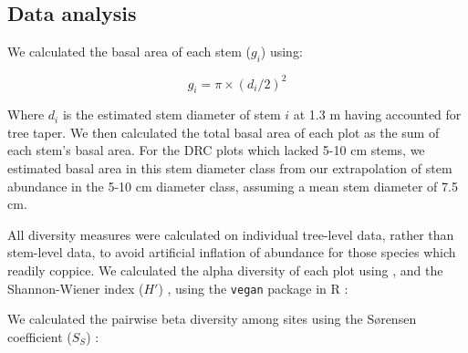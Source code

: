 \documentclass[diversity,article,submit,moreauthors,pdftex]{Definitions/mdpi}
\begin{document}
\subsection{Data analysis}

We calculated the basal area of each stem ($g_{i}$) using:

\begin{equation}
	g_{i} = \pi{} \times (d_{i} / 2)^{2}
\end{equation}

Where $d_{i}$ is the estimated stem diameter of stem $i$ at 1.3 m having accounted for tree taper. We then calculated the total basal area of each plot as the sum of each stem's basal area. For the DRC plots which lacked 5-10 cm stems, we estimated basal area in this stem diameter class from our extrapolation of stem abundance in the 5-10 cm diameter class, assuming a mean stem diameter of 7.5 cm.

All diversity measures were calculated on individual tree-level data, rather than stem-level data, to avoid artificial inflation of abundance for those species which readily coppice. We calculated the alpha diversity of each plot using , and the Shannon-Wiener index ($H'$) , using the \texttt{vegan} package in R \citep{vegan}:



We calculated the pairwise beta diversity among sites using the S\o{}rensen coefficient ($S_{S}$)  
\citep{Koleff2003}:


\end{document}
